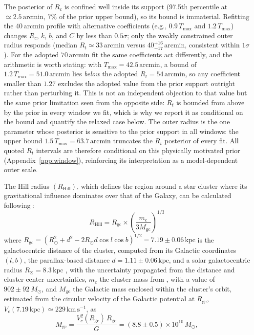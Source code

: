 \documentclass{aa}
\begin{document}
The posterior of $R_c$ is confined well inside its support (97.5th percentile at $\simeq2.5\,\mathrm{arcmin}$, $7\%$ of the prior upper bound), so its bound is immaterial. Refitting the $40\,\mathrm{arcmin}$ profile with alternative coefficients (e.g., $0.9\,T_{\mathrm{max}}$ and $1.2\,T_{\mathrm{max}}$) changes $R_c$, $k$, $b$, and $C$ by less than $0.5\sigma$; only the weakly constrained outer radius responds (median $R_t\simeq33\,\mathrm{arcmin}$ versus $40^{+16}_{-17}\,\mathrm{arcmin}$, consistent within $1\sigma$). For the adopted $70\,\mathrm{arcmin}$ fit the same coefficients act differently, and the arithmetic is worth stating: with $T_{\mathrm{max}}=42.5\,\mathrm{arcmin}$, a bound of $1.2\,T_{\mathrm{max}}=51.0\,\mathrm{arcmin}$ lies \emph{below} the adopted $R_t=54\,\mathrm{arcmin}$, so any coefficient smaller than $1.27$ excludes the adopted value from the prior support outright rather than perturbing it. This is not an independent objection to that value but the same prior limitation seen from the opposite side: $R_t$ is bounded from above by the prior in every window we fit, which is why we report it as conditional on the bound and quantify the relaxed case below. The outer radius is the one parameter whose posterior is sensitive to the prior support in all windows: the upper bound $1.5\,T_{\mathrm{max}}=63.7\,\mathrm{arcmin}$ truncates the $R_t$ posterior of every fit. All quoted $R_t$ intervals are therefore conditional on this physically motivated prior (Appendix~\ref{app:window}), reinforcing its interpretation as a model-dependent outer scale.

The Hill radius $(R_\mathrm{Hill})$, which defines the region around a star cluster where its gravitational influence dominates over that of the Galaxy, can be calculated following \citet{2019A&A...627A.119C}:
\begin{equation}
R_\mathrm{Hill} = R_{\mathrm{gc}} \times \left(\frac{m_c}{3M_{\mathrm{gc}}}\right)^{1/3}
\end{equation}
where $R_{\mathrm{gc}} = \left(R_\odot^{2} + d^{2} - 2 R_\odot d \cos l \cos b\right)^{1/2} = 7.19 \pm 0.06\,\mathrm{kpc}$ is the galactocentric distance of the cluster, computed from its Galactic coordinates $(l,b)$, the parallax-based distance $d = 1.11 \pm 0.06\,\mathrm{kpc}$, and a solar galactocentric radius $R_\odot = 8.3\,\mathrm{kpc}$ \citep{2016ApJS..227....5D}, with the uncertainty propagated from the distance and cluster-center uncertainties, $ m_c $ the cluster mass from \citet{2024arXiv240305143H}, with a value of $902 \pm 92~M_\odot$, and $ M_{\mathrm{gc}} $ the Galactic mass enclosed within the cluster's orbit, estimated from the circular velocity of the \citet{2017MNRAS.465...76M} Galactic potential at $R_{\mathrm{gc}}$, $V_c(7.19\,\mathrm{kpc}) \simeq 229\,\mathrm{km\,s^{-1}}$, as
\begin{equation}
	M_{\mathrm{gc}} = \frac{V_c^2(R_{\mathrm{gc}})\, R_{\mathrm{gc}}}{G} = (8.8 \pm 0.5) \times 10^{10}\,M_\odot,
\end{equation}
\end{document}
